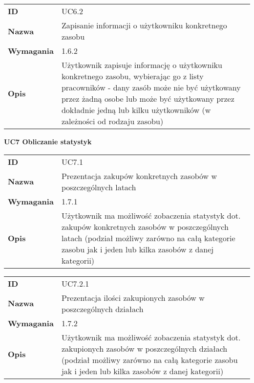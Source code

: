 \vspace{.05\textheight}

\begin{tabular}{p{}p{}}
\hfill {\bf ID} & UC6.2 \\
\hfill {\bf Nazwa} & Zapisanie informacji o użytkowniku konkretnego zasobu \\
\hfill {\bf Wymagania} & 1.6.2 \\
\hfill {\bf Opis} &  Użytkownik zapisuje informację o użytkowniku konkretnego zasobu,  wybierając go z listy pracowników - dany zasób może nie być użytkowany przez żadną osobe lub może być użytkowany przez dokładnie jedną lub kilku użytkowników (w zależności od rodzaju zasobu) \\
\end{tabular}

\vspace{.03\textheight}
\begin{center}
  {\Large\bf UC7 Obliczanie statystyk }
\end{center}
\vspace{.02\textheight}

\begin{tabular}{p{}p{}}
\hfill {\bf ID} & UC7.1 \\
\hfill {\bf Nazwa} &  Prezentacja zakupów konkretnych zasobów w poszczególnych latach \\
\hfill {\bf Wymagania} & 1.7.1 \\
\hfill {\bf Opis} & Użytkownik ma możliwość zobaczenia statystyk dot. zakupów konkretnych zasobów w poszczególnych latach (podział możliwy zarówno na całą kategorie zasobu jak i jeden lub kilka zasobów z danej kategorii) \\
\end{tabular}

\vspace{.05\textheight}

\begin{tabular}{p{}p{}}
\hfill {\bf ID} &  UC7.2.1 \\
\hfill {\bf Nazwa} & Prezentacja ilości zakupionych zasobów w poszczególnych działach \\
\hfill {\bf Wymagania} & 1.7.2 \\
\hfill {\bf Opis} & Użytkownik ma możliwość zobaczenia statystyk dot. zakupionych zasobów w poszczególnych działach (podział możliwy zarówno na całą kategorie zasobu jak i jeden lub kilka zasobów z danej kategorii) \\
\end{tabular}

